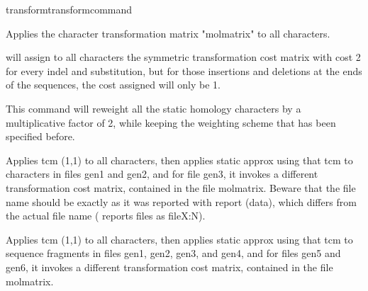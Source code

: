 \begin{command}{transform}{transformcommand}
\begin{poyexamples}
            {Applies the character transformation matrix "molmatrix" to all
            characters.}
            	
		
		
		{will assign to all characters the symmetric transformation cost
		matrix with cost 2 for every indel and substitution, but for those
		insertions and deletions at the ends of the sequences, the cost
		assigned will only be 1.}
		
            {This command will reweight all the static homology characters
            by a multiplicative factor of 2, while keeping the weighting
            scheme that has been specified before.}
		
		

            {Applies tcm (1,1) to all characters, then applies static approx
            using that tcm to characters in files gen1 and gen2, and for file
            gen3, it invokes a different transformation cost matrix, contained
            in the file molmatrix. Beware that the file name should be exactly
            as it was reported with report (data), which differs from the actual
            file name ( reports files as fileX:N).}

            {Applies tcm (1,1) to all characters, then applies static approx
            using that tcm to sequence fragments in files gen1, gen2, gen3, and
            gen4, and for files gen5 and gen6, it invokes a different
            transformation cost matrix, contained in the file molmatrix.}
         

\end{poyexamples}
\end{command}
